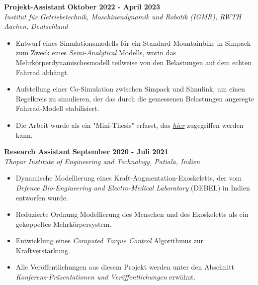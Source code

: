 \large{\textbf{Projekt-Assistant}}
\hfill
\large{\textbf{Oktober 2022 - April 2023}}\\
\emph{\large{Institut für Getriebetechnik, Maschinendynamik und Robotik (IGMR), RWTH Aachen, Deutschland}}
\begin{itemize}
	\item \large{Entwurf eines Simulationsmodells für ein Standard-Mountainbike in Simpack zum Zweck eines \emph{Semi-Analytical} Modells, worin das Mehrkörperdynamischesmodell teilweise von den Belastungen auf dem echten Fahrrad abhängt.}
	\item\large{Aufstellung einer Co-Simulation zwischen Simpack und Simulink, um einen Regelkreis zu simulieren, der das durch die gemessenen Belastungen angeregte Fahrrad-Modell stabilisiert.}
	\item\large{Die Arbeit wurde als ein "Mini-Thesis" erfasst, das \href{https://github.com/average-engineer/MiniThesis_IGMR/blob/master/Thesis.pdf}{\large{\textit{hier}}} zugegriffen werden kann.}
\end{itemize}

\vspace{0.1 in}

\large{\textbf{Research Assistant}}
\hfill
\large{\textbf{September 2020 - Juli 2021}}\\
\emph{\large{Thapar Institute of Engineering and Technology, Patiala, Indien}}
\begin{itemize}
	\item \large{Dynamische Modellierung eines Kraft-Augmentation-Exoskeletts, der vom \emph{Defence Bio-Engineering and Electro-Medical Laboratory} (DEBEL) in Indien entworfen wurde.}
	\item\large{Reduzierte Ordnung Modellierung des Menschen und des Exoskeletts als ein gekoppeltes Mehrkörpersystem.}
	\item\large{Entwicklung eines \emph{Computed Torque Control} Algorithmus zur Kraftverstärkung.}
	\item\large{Alle Veröffentlichungen aus diesem Projekt werden unter den Abschnitt \emph{Konferenz-Präsentationen und Veröffentlichungen} erwähnt. }
\end{itemize}




